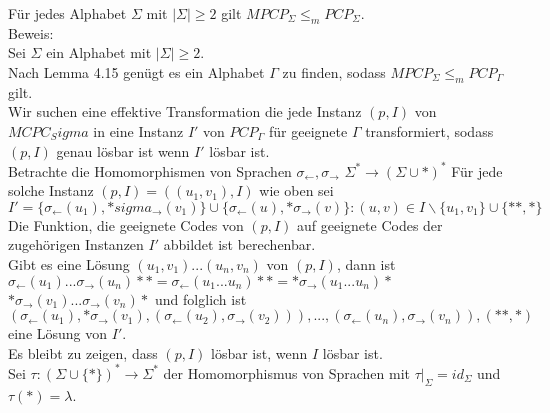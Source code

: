 \begin{lemma}{}
    Für jedes Alphabet $\Sigma$ mit $|\Sigma| \geq 2$ gilt $MPCP_\Sigma \leq_m PCP_\Sigma$. \\

    Beweis: \\
    Sei $\Sigma$ ein Alphabet mit $|\Sigma| \geq 2$. \\
    Nach Lemma 4.15 genügt es ein Alphabet $\Gamma$ zu finden, sodass $MPCP_\Sigma \leq_m PCP_\Gamma$ gilt. \\

    Wir suchen eine effektive Transformation die jede Instanz $(p, I)$ von $MCPC_Sigma$ in eine Instanz
    $I'$ von $PCP_\Gamma$ für geeignete $\Gamma$ transformiert, sodass $(p,I)$ genau lösbar ist wenn $I'$ lösbar ist. \\

    Betrachte die Homomorphismen von Sprachen $\sigma_{\leftarrow}, \sigma_{\rightarrow}$ $\Sigma^* \rightarrow (\Sigma \cup{*})^*$
    Für jede solche Instanz $(p,I) = ((u_1,v_1), I)$ wie oben sei $I'=\{\sigma_{\leftarrow}(u_1),*sigma_{\rightarrow}(v_1)\}
    \cup \{\sigma_{\leftarrow}(u),*\sigma_{\rightarrow}(v)\} : (u,v) \in I \backslash\{u_1,v_1\} \cup \{**,*\}$ \\
    
    Die Funktion, die geeignete Codes von $(p,I)$ auf geeignete Codes der zugehörigen Instanzen $I'$ abbildet ist berechenbar. \\

    Gibt es eine Lösung $(u_1,v_1)...(u_n,v_n)$ von $(p,I)$, dann ist \\
    $\sigma_\leftarrow(u_1)...\sigma_\rightarrow(u_n)** = \sigma_\leftarrow(u_1...u_n)** = *\sigma_\rightarrow(u_1...u_n)*$ \\
    $*\sigma_\rightarrow(v_1)...\sigma_\rightarrow(v_n)*$ und folglich ist \\
    $(\sigma_\leftarrow(u_1),*\sigma_\rightarrow(v_1),(\sigma_\leftarrow(u_2),\sigma_\rightarrow(v_2))),...,
    (\sigma_\leftarrow(u_n),\sigma_\rightarrow(v_n)),(**,*)$ eine Lösung von $I'$. \\

    Es bleibt zu zeigen, dass $(p,I)$ lösbar ist, wenn $I$ lösbar ist. \\

    Sei $\tau : (\Sigma \cup \{*\})^* \rightarrow \Sigma^*$ der Homomorphismus von Sprachen mit $\tau|_\Sigma = id_\Sigma$
    und $\tau(*) = \lambda$. \\


\end{lemma}
